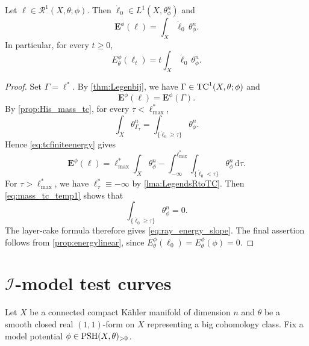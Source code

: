 \begin{corollary}\label{cor:ray_energy_slope}
    Let $\ell\in \mathcal{R}^1(X,\theta;\phi)$. Then $\dot{\ell}_0\in L^1(X,\theta_{\phi}^n)$ and
    \begin{equation}\label{eq:ray_energy_slope}
        \mathbf{E}^{\phi}(\ell)=\int_X \dot{\ell}_0\,\theta_{\phi}^n.
    \end{equation}
    In particular, for every $t\geq 0$,
    \[
        E_{\theta}^{\phi}(\ell_t)=t\int_X \dot{\ell}_0\,\theta_{\phi}^n.
    \]
\end{corollary}
\begin{proof}
    Set $\Gamma=\ell^*$. By \cref{thm:Legenbij}, we have $\Gamma\in \mathrm{TC}^1(X,\theta;\phi)$ and
    \[
        \mathbf{E}^{\phi}(\ell)=\mathbf{E}^{\phi}(\Gamma).
    \]
    By \cref{prop:His_mass_tc}, for every $\tau<\ell^*_{\max}$,
    \[
        \int_X \theta_{\Gamma_{\tau}}^n=\int_{\{\dot{\ell}_0\geq \tau\}} \theta_{\phi}^n.
    \]
    Hence \eqref{eq:tcfiniteenergy} gives
    \[
        \mathbf{E}^{\phi}(\ell)
        =\ell^*_{\max}\int_X \theta_{\phi}^n-\int_{-\infty}^{\ell^*_{\max}} \int_{\{\dot{\ell}_0<\tau\}}\theta_{\phi}^n\,\mathrm{d}\tau.
    \]
    For $\tau>\ell^*_{\max}$, we have $\ell^*_{\tau}\equiv -\infty$ by \cref{lma:LegendsRtoTC}. Then \eqref{eq:mass_tc_temp1} shows that 
    \[
        \int_{\{\dot{\ell}_0\geq \tau\}}\theta_{\phi}^n=0.
    \]
    The layer-cake formula therefore gives \eqref{eq:ray_energy_slope}. The final assertion follows from \cref{prop:energylinear}, since $E_{\theta}^{\phi}(\ell_0)=E_{\theta}^{\phi}(\phi)=0$.
\end{proof}



\section{\texorpdfstring{$\mathcal{I}$}{I}-model test curves}\label{sec:Imodeltc}
Let $X$ be a connected compact K\"ahler manifold of dimension $n$ and $\theta$ be a smooth closed real $(1,1)$-form on $X$ representing a big cohomology class.
Fix a model potential $\phi\in \mathrm{PSH}(X,\theta)_{>0}$.

